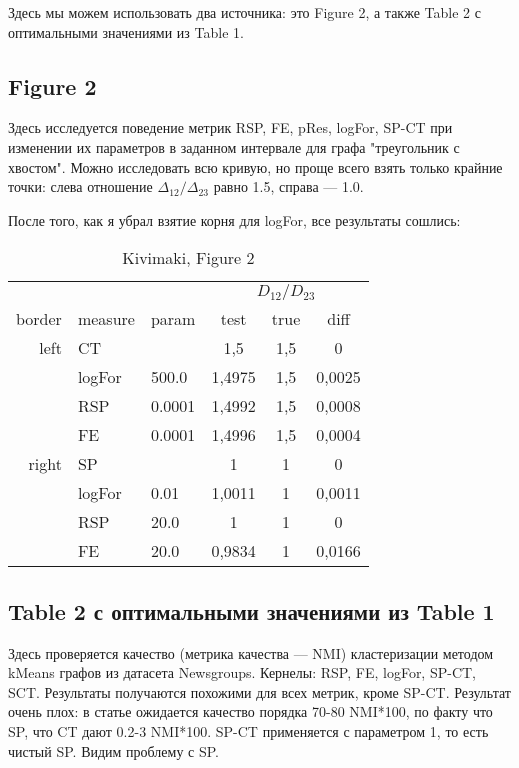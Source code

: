 \documentclass{article}
\begin{document}
Здесь мы можем использовать два источника: это Figure 2, а также Table 2 с оптимальными значениями из Table 1.

\subsection{Figure 2}
Здесь исследуется поведение метрик RSP, FE, pRes, logFor, SP-CT при изменении их параметров в заданном интервале для графа "треугольник с хвостом". Можно исследовать всю кривую, но проще всего взять только крайние точки: слева отношение $\Delta_{12}/\Delta_{23}$ равно 1.5, справа --- 1.0.

После того, как я убрал взятие корня для logFor, все результаты сошлись:

\begin{table}[H]
\centering
\caption{Kivimaki, Figure 2}
\label{my-label}
\begin{tabular}{rll|cc|c}
      &       &       & \multicolumn{3}{c}{$D_{12} / D_{23}$} \\
border & measure & param & test        & true & diff   \\
      \hline
left  & CT &          & 1,5         & 1,5  & 0      \\
      & logFor & 500.0 & 1,4975      & 1,5  & 0,0025 \\
      & RSP & 0.0001   & 1,4992      & 1,5  & 0,0008 \\
      & FE & 0.0001    & 1,4996      & 1,5  & 0,0004 \\
      \hline
right & SP &          & 1           & 1    & 0      \\
      & logFor & 0.01  & 1,0011      & 1    & 0,0011 \\
      & RSP & 20.0     & 1           & 1    & 0      \\
      & FE & 20.0      & 0,9834      & 1    & 0,0166
\end{tabular}
\end{table}

\subsection{Table 2 с оптимальными значениями из Table 1}
Здесь проверяется качество (метрика качества --- NMI) кластеризации методом kMeans графов из датасета Newsgroups. Кернелы: RSP, FE, logFor, SP-CT, SCT. Результаты получаются похожими для всех метрик, кроме SP-CT. Результат очень плох: в статье ожидается качество порядка 70-80 NMI*100, по факту что SP, что CT дают 0.2-3 NMI*100. SP-CT применяется с параметром 1, то есть чистый SP. Видим проблему с SP.
\end{document}
